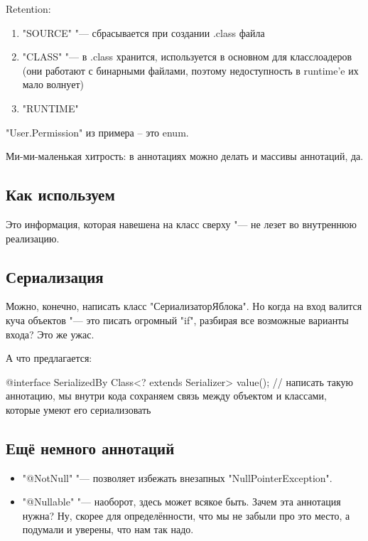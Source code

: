 Retention:
\begin{enumerate}
\item
\java"SOURCE" "--- сбрасывается при создании .class файла
\item
\java"CLASS" "--- в .class хранится, используется в основном для класслоадеров (они работают с бинарными файлами, поэтому недоступность в runtime'e их мало волнует)
\item
\java"RUNTIME"
\end{enumerate}


\java"User.Permission" из примера -- это enum.

Ми-ми-маленькая хитрость: в аннотациях можно делать и массивы аннотаций, да.

\subsection{Как используем}
Это информация, которая навешена на класс сверху "--- не лезет во внутреннюю реализацию.
\subsection{Сериализация}
Можно, конечно, написать класс "СериализаторЯблока". Но когда на вход валится куча объектов "--- это писать огромный \java"if", разбирая все
возможные варианты входа? Это же ужас.

А что предлагается:
\begin{javacode}
@interface SerializedBy {
	Class<? extends Serializer> value();
}
// написать такую аннотацию, мы внутри кода сохраняем связь между объектом и классами, которые умеют его сериализовать
\end{javacode}


\subsection{Ещё немного аннотаций}
\begin{itemize}
\item
\java"@NotNull" "--- позволяет избежать внезапных \java"NullPointerException".
\item
\java"@Nullable" "--- наоборот, здесь может всякое быть. Зачем эта аннотация нужна? 
Ну, скорее для определённости, что мы не забыли про это место, а подумали и уверены, что нам так надо.
\end{itemize}

